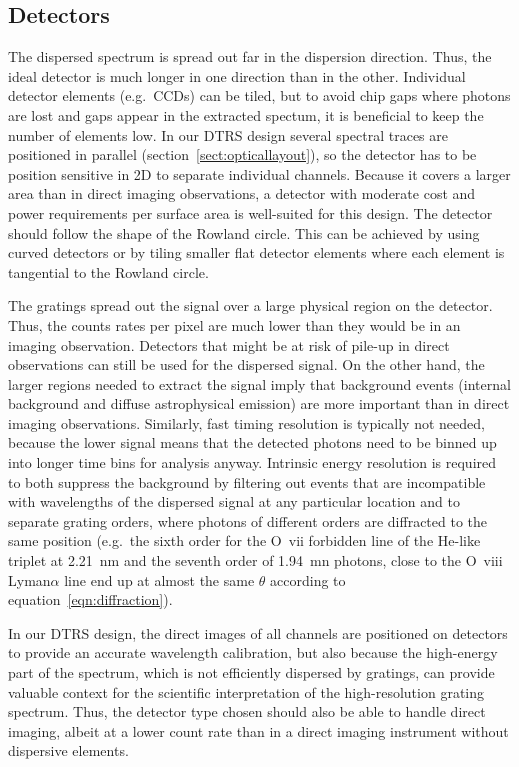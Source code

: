 \documentclass[linenumbers]{aastex631}
\begin{document}
\subsection{Detectors}
The dispersed spectrum is spread out far in the dispersion direction. Thus, the ideal detector is much longer in one direction than in the other. Individual detector elements (e.g.\ CCDs) can be tiled, but to avoid chip gaps where photons are lost and gaps appear in the extracted spectum, it is beneficial to keep the number of elements low. In our DTRS design several spectral traces are positioned in parallel (section~\ref{sect:opticallayout}), so the detector has to be position sensitive in 2D to separate individual channels.  Because it covers a larger area than in direct imaging observations, a detector with moderate cost and power requirements per surface area is well-suited for this design. The detector should follow the shape of the Rowland circle. This can be achieved by using curved detectors or by tiling smaller flat detector elements where each element is tangential to the Rowland circle.

The gratings spread out the signal over a large physical region on the detector. Thus, the counts rates per pixel are much lower than they would be in an imaging observation. Detectors that might be at risk of pile-up in direct observations can still be used for the dispersed signal. On the other hand, the larger regions needed to extract the signal imply that background events (internal background and diffuse astrophysical emission) are more important than in direct imaging observations. Similarly, fast timing resolution is typically not needed, because the lower signal means that the detected photons need to be binned up into longer time bins for analysis anyway. Intrinsic energy resolution is required to both suppress the background by filtering out events that are incompatible with wavelengths of the dispersed signal at any particular location and to separate grating orders, where photons of different orders are diffracted to the same position (e.g.\ the sixth order for the O~{\sc vii} forbidden line of the He-like triplet at 2.21~nm and the seventh order of 1.94~mn photons, close to the O~{\sc viii} Lyman$\alpha$ line end up at almost the same $\theta$ according to equation~\ref{eqn:diffraction}).

In our DTRS design, the direct images of all channels are positioned on detectors to provide an accurate wavelength calibration, but also because the high-energy part of the spectrum, which is not efficiently dispersed by gratings, can provide valuable context for the scientific interpretation of the high-resolution grating spectrum. Thus, the detector type chosen should also be able to handle direct imaging, albeit at a lower count rate than in a direct imaging instrument without dispersive elements.
\end{document}
